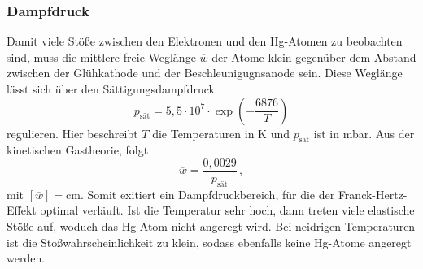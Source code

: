 \subsubsection{Dampfdruck}
Damit viele Stöße zwischen den Elektronen und den Hg-Atomen zu beobachten sind, muss die mittlere freie Weglänge $\overline{w}$ der Atome klein gegenüber dem Abstand
zwischen der Glühkathode und der Beschleunigugnsanode sein. Diese Weglänge lässt sich über den Sättigungsdampfdruck 
\begin{equation}
  p_{\text{sät}} = 5,5 \cdot 10^7 \cdot \exp \left(-\frac{6876}{T}\right)
  \label{eqn:Sättigungsdampfdruck}
\end{equation}
regulieren. Hier beschreibt $T$ die Temperaturen in \unit{\kelvin} und $p_{\text{sät}}$ ist in \unit{\milli\bar}. Aus der kinetischen Gastheorie, folgt
\begin{equation}
  \overline{w} = \frac{0,0029}{p_{\text{sät}}}\,,
  \label{eqn:mittlereWeglängeAtome}
\end{equation}
mit $[\overline{w}]=\unit{\centi\metre}$. Somit exitiert ein Dampfdruckbereich, für die der Franck-Hertz-Effekt optimal verläuft. Ist die Temperatur sehr hoch,
dann treten viele elastische Stöße auf, woduch das Hg-Atom nicht angeregt wird. Bei neidrigen Temperaturen ist die Stoßwahrscheinlichkeit zu klein, sodass ebenfalls keine 
Hg-Atome angeregt werden.
